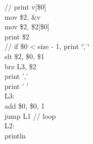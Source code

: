 \documentclass[12pt,a4paper,extrafontsizes,article]{memoir}
\begin{document}
{{\color{green!50!black}// print v[\$0]}\\
{\color{violet}mov} \$2, \&v\\
{\color{violet}mov} \$2, \$2[\$0]\\
{\color{violet}print} \$2\\
{\color{green!50!black}// if \$0 < size - 1, print \char`\", \char`\"}\\
{\color{violet}slt} \$2, \$0, \$1\\
{\color{violet}brz} L3, \$2\\
{\color{violet}print} {\color{orange}','}\\
{\color{violet}print} {\color{orange}' '}\\
{\color{red}L3:}\\
{\color{violet}add} \$0, \$0, {\color{orange}1}\\
{\color{violet}jump} L1 {\color{green!50!black}// loop}\\
{\color{red}L2:}\\
{\color{violet}println}\\
}


\backmatter



\end{document}
